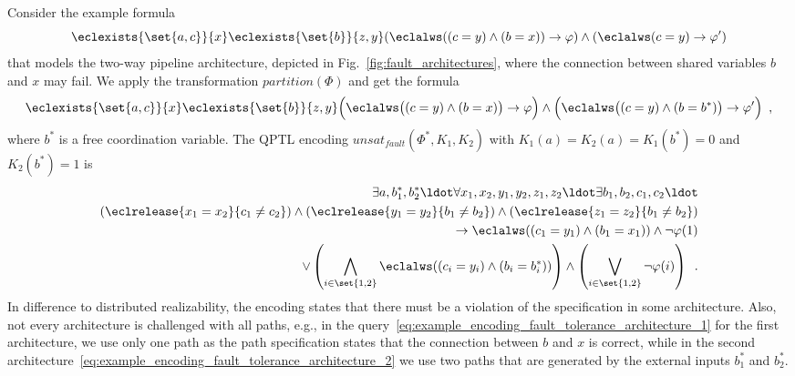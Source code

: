 \documentclass{LMCS}
\newcommand{\unsatnf}{\mathit{unsat}_\mathit{fault}}
\newcommand{\partition}{\mathit{partition}}
\theoremstyle{plain}\newtheorem{theorem}[thm]{Theorem}
\theoremstyle{plain}\newtheorem{lemma}[thm]{Lemma}
\theoremstyle{plain}\newtheorem{proposition}[thm]{Proposition}
\theoremstyle{plain}\newtheorem{corollary}[thm]{Corollary}
\theoremstyle{definition}\newtheorem{definition}{Definition}[section]
\begin{document}
Consider the example formula
\begin{equation*}
  \eclexists{\set{a,c}}{x} \eclexists{\set{b}}{z,y} (\eclalws ((c=y) \land (b=x)) \rightarrow \varphi) \land (\eclalws (c=y) \rightarrow \varphi')
\end{equation*}
that models the two-way pipeline architecture, depicted in Fig.~\ref{fig:fault_architectures}, where the connection between shared variables $b$ and $x$ may fail.
We apply the transformation $\partition(\Phi)$ and get the formula
\begin{equation*}
  \eclexists{\set{a,c}}{x} \eclexists{\set{b}}{z,y} \Big(\eclalws \big((c=y) \land (b=x)\big) \rightarrow \varphi \Big) \land \Big(\eclalws \big((c=y) \land (b=b^*)\big) \rightarrow \varphi'\Big) \enspace ,
\end{equation*}
where $b^*$ is a free coordination variable.
The QPTL encoding $\unsatnf(\Phi^*,K_1,K_2)$ with $K_1(a) = K_2(a) = K_1(b^*) = 0$ and $K_2(b^*) = 1$ is 
\begin{align}
  \exists a, b^*_1, b^*_2 \ldot \forall x_1, x_2, y_1, y_2, z_1, z_2 \ldot \exists b_1, b_2, c_1, c_2 \ldot \nonumber \\
  (\eclrelease{x_1 = x_2}{c_1 \neq c_2}) \land (\eclrelease{y_1 = y_2}{b_1 \neq b_2}) \land (\eclrelease{z_1 = z_2}{b_1 \neq b_2}) \nonumber \\
  \rightarrow \eclalws ( (c_1 = y_1) \land (b_1 = x_1) ) \land \neg\varphi(1) \label{eq:example_encoding_fault_tolerance_architecture_1}\\
  \lor \left( \bigwedge_{i \in \set{1,2}} \eclalws ((c_i = y_i) \land (b_i = b_i^*)) \right) \land \left( \bigvee_{i \in \set{1,2}} \neg \varphi(i) \right) \enspace. \label{eq:example_encoding_fault_tolerance_architecture_2}
\end{align}
In difference to distributed realizability, the encoding states that there must be a violation of the specification in some architecture.
Also, not every architecture is challenged with all paths, e.g., in the query~\eqref{eq:example_encoding_fault_tolerance_architecture_1} for the first architecture, we use only one path as the path specification states that the connection between $b$ and $x$ is correct, while in the second architecture~\eqref{eq:example_encoding_fault_tolerance_architecture_2} we use two paths that are generated by the external inputs $b^*_1$ and $b^*_2$.
\end{document}
